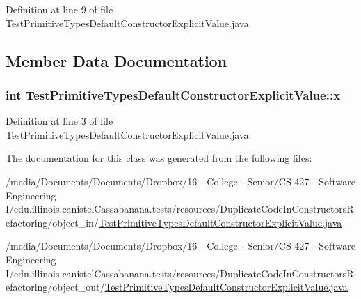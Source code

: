 Definition at line 9 of file TestPrimitiveTypesDefaultConstructorExplicitValue.java.



\subsection{Member Data Documentation}
\hypertarget{classTestPrimitiveTypesDefaultConstructorExplicitValue_a03b0399474d7b238638597188620fb59}{
\subsubsection[{x}]{\setlength{\rightskip}{0pt plus 5cm}int {\bf TestPrimitiveTypesDefaultConstructorExplicitValue::x}}}
\label{classTestPrimitiveTypesDefaultConstructorExplicitValue_a03b0399474d7b238638597188620fb59}


Definition at line 3 of file TestPrimitiveTypesDefaultConstructorExplicitValue.java.



The documentation for this class was generated from the following files:\begin{DoxyCompactItemize}
\item 
/media/Documents/Documents/Dropbox/16 -\/ College -\/ Senior/CS 427 -\/ Software Engineering I/edu.illinois.canistelCassabanana.tests/resources/DuplicateCodeInConstructorsRefactoring/object\_\-in/\hyperlink{object__in_2TestPrimitiveTypesDefaultConstructorExplicitValue_8java}{TestPrimitiveTypesDefaultConstructorExplicitValue.java}\item 
/media/Documents/Documents/Dropbox/16 -\/ College -\/ Senior/CS 427 -\/ Software Engineering I/edu.illinois.canistelCassabanana.tests/resources/DuplicateCodeInConstructorsRefactoring/object\_\-out/\hyperlink{object__out_2TestPrimitiveTypesDefaultConstructorExplicitValue_8java}{TestPrimitiveTypesDefaultConstructorExplicitValue.java}\end{DoxyCompactItemize}
